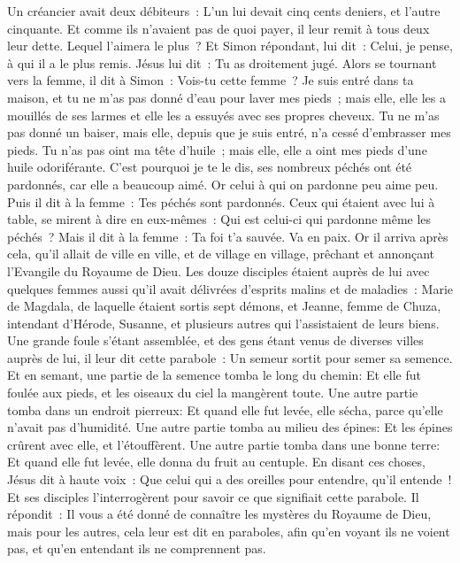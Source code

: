 \begin{multicols}{2}
Un créancier avait deux débiteurs~: L'un lui devait cinq cents deniers, et l'autre cinquante.
Et comme ils n'avaient pas de quoi payer, il leur remit à tous deux leur dette. Lequel l'aimera le plus~?
Et Simon répondant, lui dit~: Celui, je pense, à qui il a le plus remis. Jésus lui dit~: Tu as droitement jugé.
Alors se tournant vers la femme, il dit à Simon~: Vois-tu cette femme~? Je suis entré dans ta maison, et tu ne m'as pas donné d'eau pour laver mes pieds~; mais elle, elle les a mouillés de ses larmes et elle les a essuyés avec ses propres cheveux.
Tu ne m'as pas donné un baiser, mais elle, depuis que je suis entré, n'a cessé d'embrasser mes pieds.
Tu n'as pas oint ma tête d'huile~; mais elle, elle a oint mes pieds d'une huile odoriférante.
C'est pourquoi je te le dis, ses nombreux péchés ont été pardonnés, car elle a beaucoup aimé. Or celui à qui on pardonne peu aime peu.
Puis il dit à la femme~: Tes péchés sont pardonnés.
Ceux qui étaient avec lui à table, se mirent à dire en eux-mêmes~: Qui est celui-ci qui pardonne même les péchés~?
Mais il dit à la femme~: Ta foi t'a sauvée. Va en paix.
\VerseOne{}Or il arriva après cela, qu'il allait de ville en ville, et de village en village, prêchant et annonçant l'Evangile du Royaume de Dieu.
Les douze disciples étaient auprès de lui avec quelques femmes aussi qu'il avait délivrées d'esprits malins et de maladies~: Marie de Magdala, de laquelle étaient sortis sept démons,
et Jeanne, femme de Chuza, intendant d'Hérode, Susanne, et plusieurs autres qui l'assistaient de leurs biens.
Une grande foule s'étant assemblée, et des gens étant venus de diverses villes auprès de lui, il leur dit cette parabole~:
Un semeur sortit pour semer sa semence. Et en semant, une partie de la semence tomba le long du chemin: Et elle fut foulée aux pieds, et les oiseaux du ciel la mangèrent toute.
Une autre partie tomba dans un endroit pierreux: Et quand elle fut levée, elle sécha, parce qu'elle n'avait pas d'humidité.
Une autre partie tomba au milieu des épines: Et les épines crûrent avec elle, et l'étouffèrent.
Une autre partie tomba dans une bonne terre: Et quand elle fut levée, elle donna du fruit au centuple. En disant ces choses, Jésus dit à haute voix~: Que celui qui a des oreilles pour entendre, qu'il entende~!
Et ses disciples l'interrogèrent pour savoir ce que signifiait cette parabole.
Il répondit~: Il vous a été donné de connaître les mystères du Royaume de Dieu, mais pour les autres, cela leur est dit en paraboles, afin qu'en voyant ils ne voient pas, et qu'en entendant ils ne comprennent pas.

\end{multicols}
